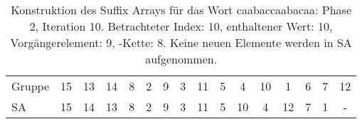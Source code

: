 \begin{table}[H]
\begin{adjustbox}{max width=\textwidth}
\begin{tabular}{lccccccccccccccc}
\multicolumn{1}{l|}{Gruppe}  & \multicolumn{1}{c|}{15} & 13 & \multicolumn{1}{c|}{14} & \multicolumn{1}{c|}{8}     & \multicolumn{1}{c|}{2}      & \multicolumn{1}{c|}{9}    & \multicolumn{1}{c|}{3}     & \multicolumn{1}{c|}{11} & \multicolumn{1}{c|}{5}   & 4                          & \multicolumn{1}{c|}{10} & 1   & 6   & 7   & 12  \\
\multicolumn{1}{l|}{SA}      & \multicolumn{1}{c|}{15} & 14 & \multicolumn{1}{c|}{13} & \multicolumn{1}{c|}{8}     & \multicolumn{1}{c|}{2}      & \multicolumn{1}{c|}{9}    & \multicolumn{1}{c|}{3}     & \multicolumn{1}{c|}{11} & \multicolumn{1}{c|}{5}   & \cellcolor[HTML]{\green}10 & \multicolumn{1}{c|}{4}  & 12  & 7   & 1   & -  
\end{tabular}
\end{adjustbox}

\caption[Konstruktion des Suffix Arrays für das Wort caabaccaabacaa: Phase 2, Iteration 10]{Konstruktion des Suffix Arrays für das Wort caabaccaabacaa: Phase 2, Iteration 10. Betrachteter Index: 10, enthaltener Wert: 10, Vorgängerelement: 9, \prevpointer-Kette: 8. Keine neuen Elemente werden in SA aufgenommen.} 
\label{table_complex_example_2_10} 
\end{table}

